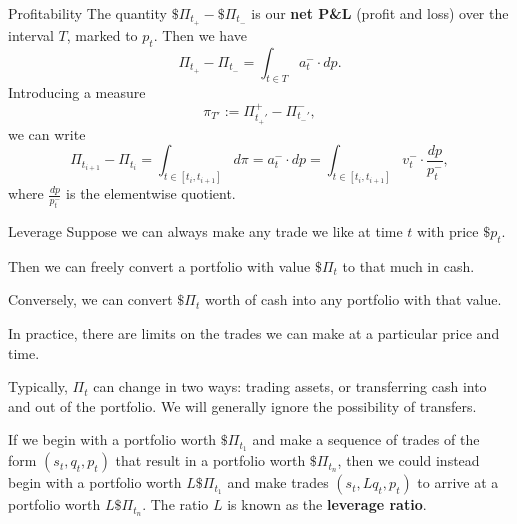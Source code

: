 \documentclass{beamer}
\begin{document}
\begin{frame}{Profitability}
	The quantity $\$\Pi_{t_+} - \$\Pi_{t_-}$ is our \textbf{net P\&L} (profit and loss) over the interval $T$, marked to $p_t$.
	Then we have
	$$\Pi_{t_+} - \Pi_{t_-} = \int_{t\in T} a_t^- \cdot dp.$$
	Introducing a measure
	$$\pi_{T'} := \Pi_{t_+'}^+ - \Pi_{t_-'}^-,$$
	we can write
	$$\Pi_{t_{i+1}} - \Pi_{t_i} = \int_{t\in [t_i, t_{i+1}]} d\pi = a_t^- \cdot dp = \int_{t\in [t_i, t_{i+1}]} v_t^- \cdot \frac{dp}{p_t^-},$$
	where $\frac{dp}{p_t^-}$ is the elementwise quotient.
\end{frame}

\begin{frame}{Leverage}
	Suppose we can always make any trade we like at time $t$ with price $\$p_t$. %

	Then we can freely convert a portfolio with value $\$\Pi_t$ to that much in cash.

	Conversely, we can convert $\$\Pi_t$ worth of cash into any portfolio with that value.

	In practice, there are limits on the trades we can make at a particular price and time.

	\pause

	Typically, $\Pi_t$ can change in two ways: trading assets, or transferring cash into and out of the portfolio. We will generally ignore the possibility of transfers.

	\pause

	If we begin with a portfolio worth $\$\Pi_{t_1}$ and make a sequence of trades of the form $(s_t,q_t,p_t)$ that result in a portfolio worth $\$\Pi_{t_n}$, then we could instead begin with a portfolio worth $L \$\Pi_{t_1}$ and make trades $(s_t, L q_t, p_t)$ to arrive at a portfolio worth $L \$\Pi_{t_n}$. The ratio $L$ is known as the \textbf{leverage ratio}.
\end{frame}
\end{document}
